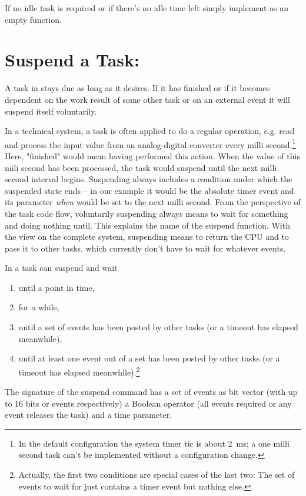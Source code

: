 If no idle task is required or if there's no idle time left simply
implement  as an empty function.


\section{Suspend a Task: }
\label{secAPIWaitForEvent}

A task in \rtos{} stays due as long as it desires. If it has finished or
if it becomes dependent on the work result of some other task or on an
external event it will suspend itself voluntarily.

In a technical system, a task is often applied to do a regular operation,
e.g. read and process the input value from an analog-digital converter
every milli second.\footnote{In the \rtos{} default configuration the
system timer tic is about 2~ms; a one milli second task can't be
implemented without a configuration change.} Here, "finished" would mean
having performed this action. When the value of this mili second has been
processed, the task would suspend until the next milli second interval
begins. Suspending always includes a condition under which the suspended
state ends -- in our example it would be the absolute timer event and its
parameter \emph{when} would be set to the next milli second. From the
perspective of the task code flow, voluntarily suspending always means to
wait for something and doing nothing until. This explains the name of the
suspend function. With the view on the complete system, suspending means
to return the CPU and to pass it to other tasks, which currently don't
have to wait for whatever events.

In \rtos{} a task can suspend and wait
\begin{enumerate}
  \item until a point in time,
  \item for a while,
  \item until a set of events has been posted by other tasks (or a timeout
    has elapsed meanwhile),
  \item until at least one event out of a set has been posted by other
    tasks (or a timeout has elapsed meanwhile).\footnote{Actually, the
    first two conditions are special cases of the last two: The set of
    events to wait for just contains a timer event but nothing else.}
\end{enumerate}

The signature of the suspend command has a set of events as bit vector
(with up to 16 bits or events respectively) a Boolean operator (all events
required or any event releases the task) and a time parameter.


